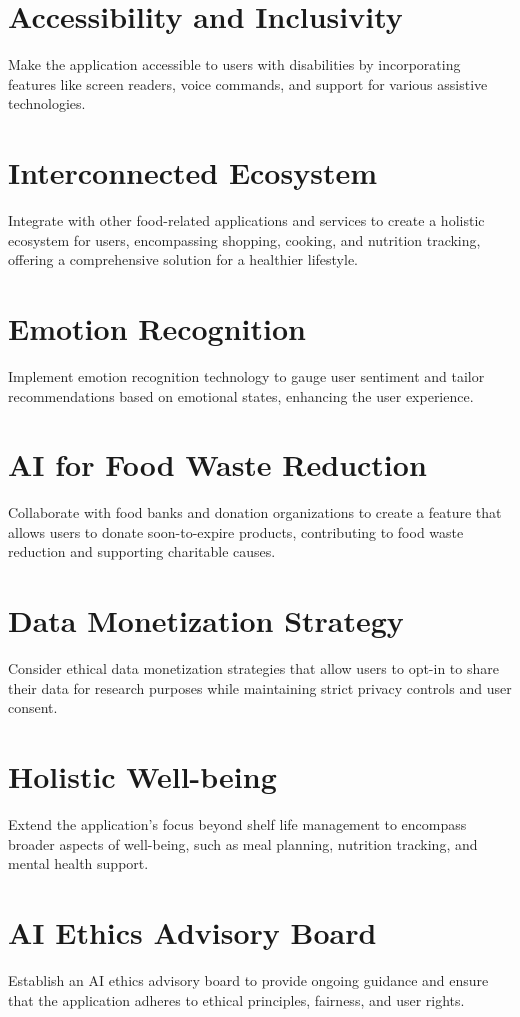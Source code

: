 \section{Accessibility and Inclusivity}
Make the application accessible to users with disabilities by incorporating features like screen readers, voice commands, and support for various assistive technologies.

\section{Interconnected Ecosystem}
Integrate with other food-related applications and services to create a holistic ecosystem for users, encompassing shopping, cooking, and nutrition tracking, offering a comprehensive solution for a healthier lifestyle.

\section{Emotion Recognition}
Implement emotion recognition technology to gauge user sentiment and tailor recommendations based on emotional states, enhancing the user experience.

\section{AI for Food Waste Reduction}
Collaborate with food banks and donation organizations to create a feature that allows users to donate soon-to-expire products, contributing to food waste reduction and supporting charitable causes.

\section{Data Monetization Strategy}
Consider ethical data monetization strategies that allow users to opt-in to share their data for research purposes while maintaining strict privacy controls and user consent.

\section{Holistic Well-being}
Extend the application's focus beyond shelf life management to encompass broader aspects of well-being, such as meal planning, nutrition tracking, and mental health support.

\section{AI Ethics Advisory Board}
Establish an AI ethics advisory board to provide ongoing guidance and ensure that the application adheres to ethical principles, fairness, and user rights.
